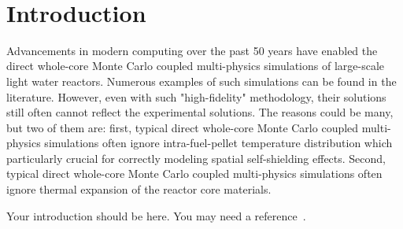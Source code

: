 \documentclass[11pt,a4paper,onecolumn,oneside]{report}
\begin{document}
%



\hbox{ }
\thispagestyle{empty}
\clearpage

\tableofcontents{}
\thispagestyle{empty}
\vfill
\clearpage

\listoffigures
\thispagestyle{empty}
\clearpage

\listoftables
\thispagestyle{empty}
\clearpage

\setcounter{page}{1}



\section{Introduction}
Advancements in modern computing over the past 50 years have enabled the direct whole-core Monte Carlo coupled multi-physics simulations of large-scale light water reactors. Numerous examples of such simulations can be found in the literature. However, even with such "high-fidelity" methodology, their solutions still often cannot reflect the experimental solutions. The reasons could be many, but two of them are: first, typical direct whole-core Monte Carlo coupled multi-physics simulations often ignore intra-fuel-pellet temperature distribution which particularly crucial for correctly modeling spatial self-shielding effects. Second, typical direct whole-core Monte Carlo coupled multi-physics simulations often ignore thermal expansion of the reactor core materials.

Your introduction should be here. You may need a reference~\cite{ref_sample}.
\end{document}
